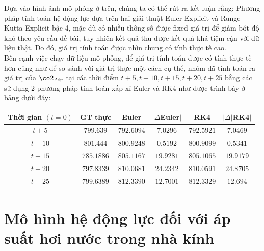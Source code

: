 \documentclass[13pt,a4paper]{article}
\begin{document}
		Dựa vào hình ảnh mô phỏng ở trên, chúng ta có thể rút ra kết luận rằng: Phương pháp tính toán hệ động lực dựa trên hai giải thuật Euler Explicit và Runge Kutta Explicit bậc 4, mặc dù có nhiều thông số được fixed giá trị để giảm bớt độ khó theo yêu cầu đề bài, tuy nhiên kết quả thu được kết quả khá tiệm cận với dữ liệu thật. Do đó, giá trị tính toán được nhìn chung có tính thực tế cao. \\
		Bên cạnh việc chạy dữ liệu mô phỏng, để giá trị tính toán được có tính thực tế hơn cũng như để so sánh với giá trị thực một cách cụ thể, nhóm đã tính toán ra giá trị của $\co2_{Air}$ tại các thời điểm $t+5,t+10,t+15,t+20,t+25$ bằng các sử dụng 2 phương pháp tính toán xấp xỉ Euler và RK4 như được trình bày ở bảng dưới đây:
		\begin{center}
			\begin{tabular}{|c|c|c|c|c|c|}
				\hline
				Thời gian $(t=0)$ & GT thực & Euler & $|\Delta$Euler$|$ & RK4 & $|\Delta|$RK4$|$ \\
				\hline
				$t + 5$ & $799.639$ & $792.6094$ & $7.0296$ & $792.5921$ & $7.0469$ \\
				\hline
				$t + 10$ & $801.444$ & $800.9248$ & $0.5192$ & $800.9099$ & $0.5341$ \\
				\hline
				$t + 15$ & $785.1886$ & $805.1167$ & $19.9281$ & $805.1065$  & $19.9179$ \\
				\hline
				$t + 20$ & $797.8339$ & $810.0681$ & $24.2342$ & $810.0591$ & $24.8705$ \\
				\hline
				$t + 25$ & $799.6389$ & $812.3390$ & $12.7001$ & $812.3329$ & $12.694$ \\
				\hline
			\end{tabular}
		\end{center}
	
	\section{Mô hình hệ động lực đối với áp suất hơi nước trong nhà kính}
\end{document}
